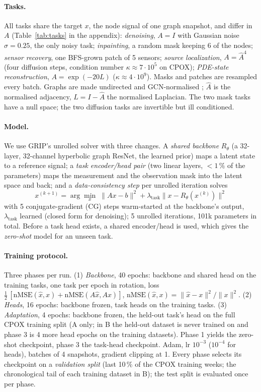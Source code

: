 \documentclass{article}
\newcommand{\nmse}{\mathrm{nMSE}}
\begin{document}
\paragraph{Tasks.} All tasks share the target $x$, the node signal of one graph snapshot, and differ in $A$
(Table~\ref{tab:tasks} in the appendix): \emph{denoising}, $A = I$ with Gaussian noise $\sigma = 0.25$, the only
noisy task; \emph{inpainting}, a random mask keeping 6 of the nodes; \emph{sensor recovery}, one BFS-grown patch
of 5 sensors; \emph{source localization}, $A = \hat A^{4}$ (four diffusion steps, condition number
$\kappa \approx 7 \cdot 10^{5}$ on CPOX); \emph{PDE-state reconstruction}, $A = \exp(-20 L)$
($\kappa \approx 4 \cdot 10^{9}$). Masks and patches are resampled every batch. Graphs are made undirected and
GCN-normalised \citep{kipf2017gcn}; $\hat A$ is the normalised adjacency, $L = I - \hat A$ the normalised
Laplacian. The two mask tasks have a null space; the two diffusion tasks are invertible but ill conditioned.


\paragraph{Model.} We use GRIP's unrolled solver with three changes. A \emph{shared backbone} $R_\theta$ (a 32-layer, 32-channel hyperbolic graph ResNet, the learned prior) maps a
latent state to a reference signal; a \emph{task encoder/head pair} (two linear layers, $< 1\,\%$ of the
parameters) maps the measurement and the observation mask into the latent space and back; and a
\emph{data-consistency step} per unrolled iteration solves
\begin{equation}
  x^{(k+1)} = \arg\min_x \; \|A x - b\|^{2} + \lambda_{\text{task}} \|x - R_\theta(x^{(k)})\|^{2}
  \label{eq:prox}
\end{equation}
with 5 conjugate-gradient (CG) steps warm-started at the backbone's output, $\lambda_{\text{task}}$ learned
(closed form for denoising); 5 unrolled iterations, 101k parameters in total. Before a task head exists, a
shared encoder/head is used, which gives the \emph{zero-shot} model for an unseen task.

\paragraph{Training protocol.} Three phases per run. (1) \emph{Backbone}, 40 epochs: backbone and shared
head on the training tasks, one task per epoch in rotation, loss
$\tfrac12\,[\nmse(\hat x, x) + \nmse(A \hat x, A x)]$, $\nmse(\hat x, x) = \|\hat x - x\|^{2} / \|x\|^{2}$.
(2) \emph{Heads}, 16 epochs: backbone frozen, task heads on the training tasks.
(3) \emph{Adaptation}, 4 epochs: backbone frozen, the held-out task's head on the full CPOX training split
(A only; in B the held-out dataset is never trained on and phase 3 is 4 more head epochs on the training
datasets). Phase 1 yields the zero-shot checkpoint, phase 3 the task-head checkpoint. Adam, lr $10^{-3}$
($10^{-4}$ for heads), batches of 4 snapshots, gradient clipping at 1. Every phase selects its checkpoint on a
\emph{validation split} (last 10\,\% of the CPOX training weeks; the chronological tail of each training
dataset in B); the test split is evaluated once per phase.
\end{document}
